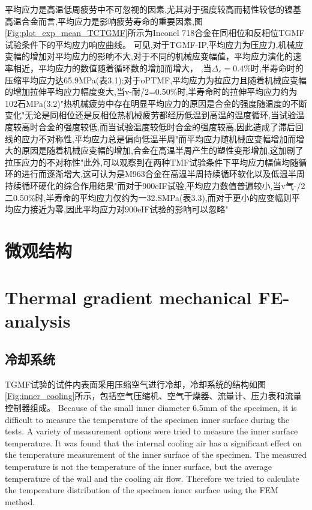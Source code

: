 \documentclass{article}
\begin{document}
平均应力是高温低周疲劳中不可忽视的因素,尤其对于强度较高而韧性较低的镍基高温合金而言,平均应力是影响疲劳寿命的重要因素,图\ref{Fig:plot_exp_mean_TCTGMF}所示为Inconel 718合金在同相位和反相位TGMF试验条件下的平均应力响应曲线。
可见,对于TGMF-IP,平均应力为压应力,机械应变幅的增加对平均应力的影响不大,对于不同的机械应变幅值，平均应力演化的速率相近，平均应力的数值随着循环数的增加而增大，
,当$\Delta_{\varepsilon}=0.4\%$时,半寿命时的压缩平均应力达65.9MPa(表3.1);对于oPTMF,平均应力为拉应力且随着机械应变幅的增加拉伸平均应力幅度变大,当v-耐/2=0.50\%时,半寿命时的拉伸平均应力约为102石MPa(3.2)"热机械疲劳中存在明显平均应力的原因是合金的强度随温度的不断变化"无论是同相位还是反相位热机械疲劳都经历低温到高温的温度循环,当试验温度较高时合金的强度较低,而当试验温度较低时合金的强度较高,因此造成了滞后回线的应力不对称性,平均应力总是偏向低温半周"而平均应力随机械应变幅增加而增大的原因是随着机械应变幅的增加,合金在高温半周产生的塑性变形增加,这加剧了拉压应力的不对称性"此外,可以观察到在两种TMF试验条件下平均应力幅值均随循环的进行而逐渐增大,这可认为是M963合金在高温半周持续循环软化以及低温半周持续循环硬化的综合作用结果"而对于900eIF试验,平均应力数值普遍较小,当v气-/2二0.50\%时,半寿命的平均应力仅约为一32.SMPa(表3.3),而对于更小的应变幅则平均应力接近为零,因此平均应力对900eIF试验的影响可以忽略"

\section{微观结构}



\section{Thermal gradient mechanical FE-analysis}

\subsection{冷却系统}


TGMF试验的试件内表面采用压缩空气进行冷却，冷却系统的结构如图\ref{Fig:inner_cooling}所示，包括空气压缩机、空气干燥器、流量计、压力表和流量控制器组成。
Because of the small inner diameter 6.5mm of the specimen, it is difficult to measure the temperature of the specimen inner surface during the tests.
A variety of measurement options were tried to measure the inner surface temperature.
It was found that the internal cooling air has a significant effect on the temperature measurement of the inner surface of the specimen.
The measured temperature is not the temperature of the inner surface, but the average temperature of the wall and the cooling air flow.
Therefore we tried to calculate the temperature distribution of the specimen inner surface using the FEM method.
\end{document}
